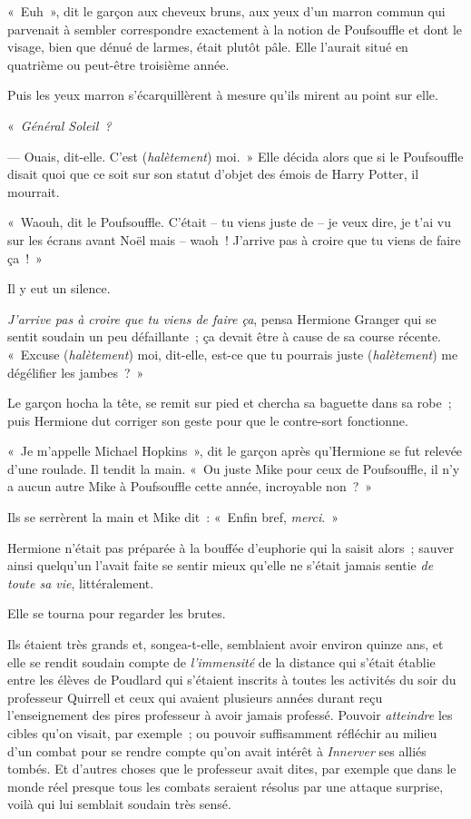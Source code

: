 «~Euh~», dit le garçon aux cheveux bruns, aux yeux d'un marron commun qui parvenait à sembler correspondre exactement à la notion de Poufsouffle et dont le visage, bien que dénué de larmes, était plutôt pâle. Elle l'aurait situé en quatrième ou peut-être troisième année.

Puis les yeux marron s'écarquillèrent à mesure qu'ils mirent au point sur elle.

«~\emph{Général Soleil~?}

--- Ouais, dit-elle. C'est (\emph{halètement}) moi.~» Elle décida alors que si le Poufsouffle disait quoi que ce soit sur son statut d'objet des émois de Harry Potter, il mourrait.

«~Waouh, dit le Poufsouffle. C'était -- tu viens juste de -- je veux dire, je t'ai vu sur les écrans avant Noël mais -- waoh~! J'arrive pas à croire que tu viens de faire ça~!~»

Il y eut un silence.

\emph{J'arrive pas à croire que tu viens de faire ça}, pensa Hermione Granger qui se sentit soudain un peu défaillante~; ça devait être à cause de sa course récente. «~Excuse (\emph{halètement}) moi, dit-elle, est-ce que tu pourrais juste (\emph{halètement}) me dégélifier les jambes~?~»

Le garçon hocha la tête, se remit sur pied et chercha sa baguette dans sa robe~; puis Hermione dut corriger son geste pour que le contre-sort fonctionne.

«~Je m'appelle Michael Hopkins~», dit le garçon après qu'Hermione se fut relevée d'une roulade. Il tendit la main. «~Ou juste Mike pour ceux de Poufsouffle, il n'y a aucun autre Mike à Poufsouffle cette année, incroyable non~?~»

Ils se serrèrent la main et Mike dit~: «~Enfin bref, \emph{merci}.~»

Hermione n'était pas préparée à la bouffée d'euphorie qui la saisit alors~; sauver ainsi quelqu'un l'avait faite se sentir mieux qu'elle ne s'était jamais sentie \emph{de toute sa vie}, littéralement.

Elle se tourna pour regarder les brutes.

Ils étaient très grands et, songea-t-elle, semblaient avoir environ quinze ans, et elle se rendit soudain compte de \emph{l'immensité} de la distance qui s'était établie entre les élèves de Poudlard qui s'étaient inscrits à toutes les activités du soir du professeur Quirrell et ceux qui avaient plusieurs années durant reçu l'enseignement des pires professeur à avoir jamais professé. Pouvoir \emph{atteindre} les cibles qu'on visait, par exemple~; ou pouvoir suffisamment réfléchir au milieu d'un combat pour se rendre compte qu'on avait intérêt à \emph{Innerver} ses alliés tombés. Et d'autres choses que le professeur avait dites, par exemple que dans le monde réel presque tous les combats seraient résolus par une attaque surprise, voilà qui lui semblait soudain très sensé.

